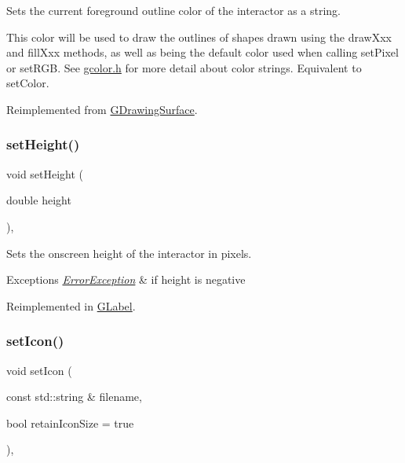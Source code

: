 Sets the current foreground outline color of the interactor as a string. 

This color will be used to draw the outlines of shapes drawn using the draw\+Xxx and fill\+Xxx methods, as well as being the default color used when calling set\+Pixel or set\+R\+GB. See \mbox{\hyperlink{gcolor_8h_source}{gcolor.\+h}} for more detail about color strings. Equivalent to set\+Color. 

Reimplemented from \mbox{\hyperlink{classGDrawingSurface_af59209aeadea6dfc6d97a2d8531f50e1}{G\+Drawing\+Surface}}.

\mbox{\label{classGInteractor_a9e280bfc4544dfaf8e4376c4e1a74357}} 
\subsubsection{\texorpdfstring{set\+Height()}{setHeight()}}
{\footnotesize\ttfamily void set\+Height (\begin{DoxyParamCaption}\item[{double}]{height }\end{DoxyParamCaption})\hspace{0.3cm}{\ttfamily [virtual]}, {\ttfamily [inherited]}}



Sets the onscreen height of the interactor in pixels. 


\begin{DoxyExceptions}{Exceptions}
{\em \mbox{\hyperlink{classErrorException}{Error\+Exception}}} & if height is negative \\
\hline
\end{DoxyExceptions}


Reimplemented in \mbox{\hyperlink{classGLabel_a8a1f6693796b536d1ace7ce0ff66afee}{G\+Label}}.

\mbox{\label{classGInteractor_a762e139aa311461c3984d3ad28293f64}} 
\subsubsection{\texorpdfstring{set\+Icon()}{setIcon()}}
{\footnotesize\ttfamily void set\+Icon (\begin{DoxyParamCaption}\item[{const std\+::string \&}]{filename,  }\item[{bool}]{retain\+Icon\+Size = {\ttfamily true} }\end{DoxyParamCaption})\hspace{0.3cm}{\ttfamily [virtual]}, {\ttfamily [inherited]}}



